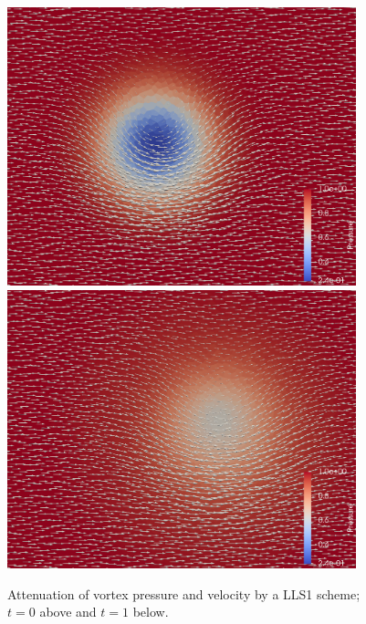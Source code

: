\begin{figure}[p]
\centering
\includegraphics[width=0.9\textwidth]{vortexarrow1.png} \\[2em]
\includegraphics[width=0.9\textwidth]{vortexarrow2.png}
\caption{Attenuation of vortex pressure and velocity by a LLS1 scheme;\\
$t = 0$ above and $t = 1$ below.}
\label{fig:comparison3-vortex}
\end{figure}

